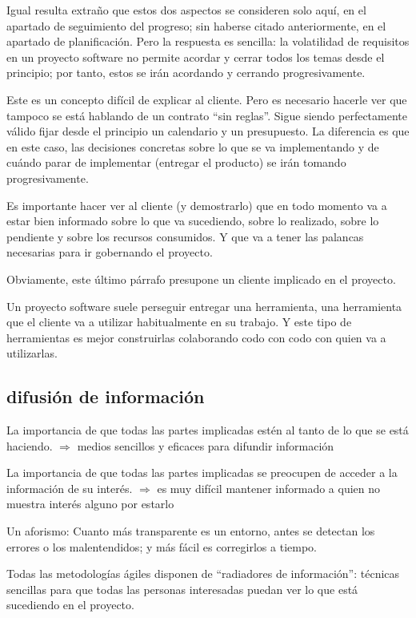 \documentclass[spanish,12pt,a4paper,final,oneside]{book}
\begin{document}
Igual resulta extraño que estos dos aspectos se consideren solo aquí, en el apartado de seguimiento del progreso; sin haberse citado anteriormente, en el apartado de planificación. Pero la respuesta es sencilla: la volatilidad de requisitos  en un proyecto software no permite acordar y cerrar todos los temas desde el principio; por tanto, estos se irán acordando y cerrando progresivamente. 

Este es un concepto difícil de explicar al cliente. Pero es necesario hacerle ver que tampoco se está hablando de un contrato ``sin reglas''. Sigue siendo perfectamente válido fijar desde el principio un calendario y un presupuesto. La diferencia es que en este caso, las decisiones concretas sobre lo que se va implementando y de cuándo parar de implementar (entregar el producto) se irán tomando progresivamente.

Es importante hacer ver al cliente (y demostrarlo) que en todo momento va a estar bien informado sobre lo que va sucediendo, sobre lo realizado, sobre lo pendiente y sobre los recursos consumidos. Y que va a tener las palancas necesarias para ir gobernando el proyecto.
 
Obviamente, este último párrafo presupone un cliente implicado en el proyecto. 

Un proyecto software suele perseguir entregar una herramienta, una herramienta que el cliente va a utilizar habitualmente en su trabajo. Y este tipo de herramientas es mejor construirlas colaborando codo con codo con quien va a utilizarlas.

\subsection{difusión de información}
La importancia de que todas las partes implicadas estén al tanto de lo que se está haciendo. $\Rightarrow$ medios sencillos y eficaces para difundir información

La importancia de que todas las partes implicadas se preocupen de acceder a la información de su interés. $\Rightarrow$ es muy difícil mantener informado a quien no muestra interés alguno por estarlo

Un aforismo: Cuanto más transparente es un entorno, antes se detectan los errores o los malentendidos; y más fácil es corregirlos a tiempo.

Todas las metodologías ágiles disponen de ``radiadores de información'': técnicas sencillas para que todas las personas interesadas puedan ver lo que está sucediendo en el proyecto.
\end{document}
